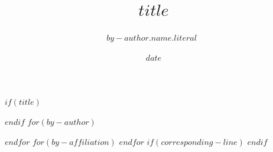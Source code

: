 \usepackage{authblk}
\usepackage{orcidlink}
\renewcommand\Affilfont{\footnotesize}

\usepackage{etoolbox}
\setlength{\LTpre}{0pt}

$if(title)$
\title{$title$}
$endif$
$for(by-author)$
\author[$for(by-author.affiliations)$$it.number$$sep$,$endfor$$if(by-author.attributes.corresponding)$,*$endif$]{$by-author.name.literal$~}
$endfor$
$for(by-affiliation)$
$endfor$
$if(corresponding-line)$
$endif$
\date{$date$}
